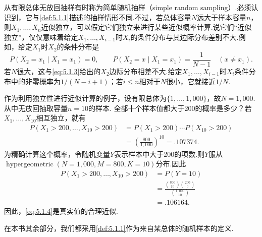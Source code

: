 从有限总体无放回抽样有时称为简单随机抽样（simple random sampling）.必须认识到，它与\autoref{def:5.1.1}描述的抽样情形不同.不过，若总体容量$N$远大于样本容量$n$，则$X_1,\ldots,X_n$近似独立，可以假定它们独立来进行某些近似概率计算.说它们“近似独立”，仅仅意味着给定$X_1,\ldots,X_{i-1}$时$X_i$的条件分布与其边际分布差别不大.例如，给定$X_1$时$X_2$的条件分布是
$$P(X_2=x_1\mid X_1=x_1)=0,\qquad P(X_2=x\mid X_1=x_1)=\frac1{N-1}\quad(x\ne x_1).$$
若$N$很大，这与\eqref{eq:5.1.3}给出的$X_2$边际分布相差不大.给定$X_1,\ldots,X_{i-1}$时$X_i$条件分布中的非零概率为$1/(N-i+1)$；若$i\le n$相对于$N$很小，它就接近$1/N$.
\begin{example}[有限总体模型]\label{ex:5.1.3}
作为利用独立性进行近似计算的例子，设有限总体为$\{1,\ldots,1{,}000\}$，故$N=1{,}000$.从中无放回抽取容量$n=10$的样本.
全部十个样本值都大于200的概率是多少？若$X_1,\ldots,X_{10}$相互独立，就有
\begin{equation}\label{eq:5.1.4}
\begin{aligned}
P(X_1>200,\ldots,X_{10}>200)&=P(X_1>200)\cdots P(X_{10}>200)\\
&=\left(\frac{800}{1{,}000}\right)^{10}=.107374.
\end{aligned}
\end{equation}
为精确计算这个概率，令随机变量$Y$表示样本中大于200的项数.则$Y$服从$\operatorname{hypergeometric}(N=1{,}000,M=800,K=10)$分布.因此
\begin{align*}
P(X_1>200,\ldots,X_{10}>200)&=P(Y=10)\\
&=\frac{\binom{800}{10}\binom{200}{0}}{\binom{1{,}000}{10}}\\
&=.106164.
\end{align*}
因此，\eqref{eq:5.1.4}是真实值的合理近似.
\end{example}
在本书其余部分，我们都采用\autoref{def:5.1.1}作为来自某总体的随机样本的定义.
